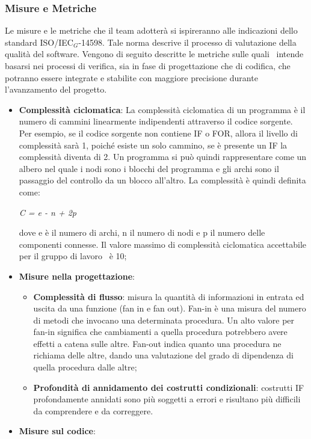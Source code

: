 \subsubsection{Misure e Metriche}
Le misure e le metriche che il team adotterà si ispireranno alle indicazioni dello standard ISO/IEC$_G$-14598. Tale norma descrive il processo di valutazione della qualità del software. Vengono di seguito descritte le metriche sulle quali \gruppo\ intende basarsi nei processi di verifica, sia in fase di progettazione che di codifica, che potranno essere integrate e stabilite con maggiore precisione durante l'avanzamento del progetto.
\begin{itemize}
    \item \textbf{Complessità ciclomatica}:
    La complessità ciclomatica di un programma è il
    numero di cammini linearmente indipendenti attraverso il codice sorgente. Per esempio, se il codice sorgente non contiene IF o FOR, allora il livello di complessità sarà 1, poiché esiste un solo 
    cammino, se è presente un IF la complessità diventa di 2. Un programma si può quindi rappresentare come un albero nel quale i nodi sono i blocchi del programma e gli archi sono il passaggio del controllo da un blocco all'altro. La complessità è quindi definita come:
    \begin{center}
    	\textit{C = e - n + 2p}
    \end{center}
    dove e è il numero di archi, n il numero di nodi e p il numero delle componenti connesse. Il valore massimo di complessità ciclomatica accettabile per il gruppo di lavoro \gruppo\ è 10;
	\item \textbf{Misure nella progettazione}:
	\begin{itemize}
		\item \textbf{Complessità di flusso}: 
		misura la quantità di informazioni in entrata ed uscita da una funzione (fan in e fan out). Fan-in è una misura del numero di metodi che invocano una determinata procedura. Un alto valore per fan-in significa che cambiamenti a quella procedura potrebbero avere effetti a catena sulle altre. Fan-out indica quanto una procedura ne richiama delle altre, dando una valutazione del grado di dipendenza di quella procedura dalle altre;
		\item \textbf{Profondità di annidamento dei costrutti condizionali}: costrutti IF profondamente annidati sono più soggetti a errori e risultano più difficili da comprendere e da correggere.
	\end{itemize}
	\item \textbf{Misure sul codice}:

\end{itemize}
